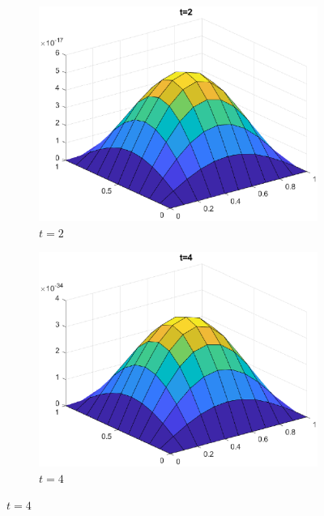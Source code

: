 \documentclass[]{article}
\begin{document}
	\begin{figure}[htbp]
		\centering	
		\begin{subfigure}[b]{0.45\textwidth}
			\includegraphics[width=\textwidth]{images/h2_t2.eps}
			\caption{$t = 2$}
			\label{fig:image4}
		\end{subfigure}
		\hfill
		\begin{subfigure}[b]{0.45\textwidth}
			\includegraphics[width=\textwidth]{images/h2_t3.eps}
			\caption{$t = 4$}
			\label{fig:image5}
		\end{subfigure}
	\end{figure}
\end{document}
